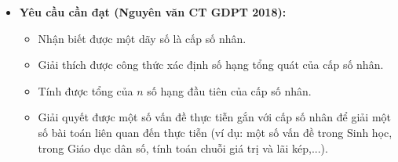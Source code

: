 \documentclass[12pt, a4paper]{article}
\begin{document}
\begin{itemize}[leftmargin=1.2cm]
    \item \textbf{Yêu cầu cần đạt (Nguyên văn CT GDPT 2018):}
    \begin{itemize}[leftmargin=0.6cm]
        \item Nhận biết được một dãy số là cấp số nhân.
        \item Giải thích được công thức xác định số hạng tổng quát của cấp số nhân.
        \item Tính được tổng của $n$ số hạng đầu tiên của cấp số nhân.
        \item Giải quyết được một số vấn đề thực tiễn gắn với cấp số nhân để giải một số bài toán liên quan đến thực tiễn (ví dụ: một số vấn đề trong Sinh học, trong Giáo dục dân số, tính toán chuỗi giá trị và lãi kép,...).
    \end{itemize}


\end{itemize}
\end{document}
